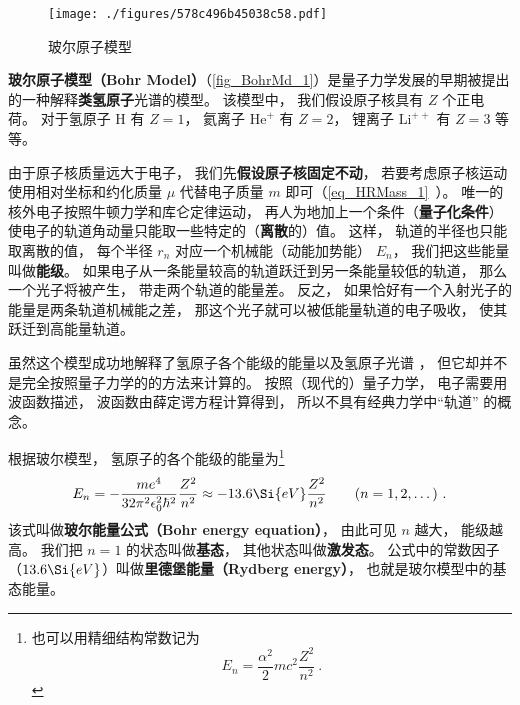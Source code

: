 

\begin{figure}[ht]
\centering
\texttt{[image: ./figures/578c496b45038c58.pdf]}
\caption{玻尔原子模型} \label{fig_BohrMd_1}
\end{figure}

\textbf{玻尔原子模型（Bohr Model）}（\autoref{fig_BohrMd_1}）是量子力学发展的早期被提出的一种解释\textbf{类氢原子}光谱的模型。 该模型中， 我们假设原子核具有 $Z$ 个正电荷。 对于氢原子 $\mathrm{H}$ 有 $Z = 1$， 氦离子 $\mathrm{He}^+$ 有 $Z = 2$， 锂离子 $\mathrm{Li}^{++}$ 有 $Z = 3$ 等等。

由于原子核质量远大于电子， 我们先\textbf{假设原子核固定不动}， 若要考虑原子核运动使用相对坐标和约化质量 $\mu$ 代替电子质量 $m$ 即可（\autoref{eq_HRMass_1}~）。
唯一的核外电子按照牛顿力学和库仑定律运动， 再人为地加上一个条件（\textbf{量子化条件}）使电子的轨道角动量只能取一些特定的（\textbf{离散}的）值。 这样， 轨道的半径也只能取离散的值， 每个半径 $r_n$ 对应一个机械能（动能加势能） $E_n$， 我们把这些能量叫做\textbf{能级}。 如果电子从一条能量较高的轨道跃迁到另一条能量较低的轨道， 那么一个光子将被产生， 带走两个轨道的能量差。 反之， 如果恰好有一个入射光子的能量是两条轨道机械能之差， 那这个光子就可以被低能量轨道的电子吸收， 使其跃迁到高能量轨道。

虽然这个模型成功地解释了氢原子各个能级的能量以及氢原子光谱%
， 但它却并不是完全按照量子力学的的方法来计算的。 按照（现代的）量子力学， 电子需要用波函数描述， 波函数由薛定谔方程计算得到， 所以不具有经典力学中“轨道” 的概念。

根据玻尔模型， 氢原子的各个能级的能量为\footnote{也可以用精细结构常数记为
\begin{equation}
E_n = \frac{\alpha^2}{2}mc^2 \frac{Z^2}{n^2}~.
\end{equation}}
\begin{equation}
E_n =  - \frac{m e^4}{32 \pi^2 \epsilon_0^2 \hbar ^2} \frac{Z^2}{n^2} \approx - 13.6\Si{eV} \frac{Z^2}{n^2}
\qquad (n = 1, 2, \dots)~.
\end{equation}
该式叫做\textbf{玻尔能量公式（Bohr energy equation）}， 由此可见 $n$ 越大， 能级越高。 我们把 $n = 1$ 的状态叫做\textbf{基态}， 其他状态叫做\textbf{激发态}。 公式中的常数因子（$13.6\Si{eV}$）叫做\textbf{里德堡能量（Rydberg energy）}， 也就是玻尔模型中的基态能量。

